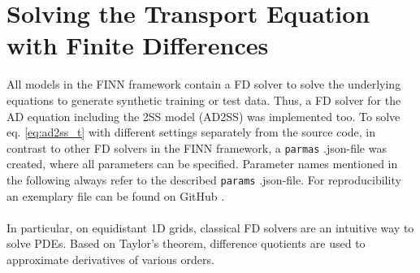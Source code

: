 \section{Solving the Transport Equation with Finite Differences}
All models in the FINN framework contain a FD solver to solve the underlying equations to generate synthetic training or test data. Thus, a FD solver for the AD equation including the 2SS model (AD2SS) was implemented too. To solve eq. \ref{eq:ad2ss_t} with different settings separately from the source code, in contrast to other FD solvers in the FINN framework, a \texttt{parmas} .json-file was created, where all parameters can be specified. Parameter names mentioned in the following always refer to the described \texttt{params} .json-file. For reproducibility an exemplary file can be found on GitHub \cite{FINN_fork}.\\
\\
In particular, on equidistant 1D grids, classical FD solvers are an intuitive way to solve PDEs. Based on Taylor's theorem, difference quotients are used to approximate derivatives of various orders.
